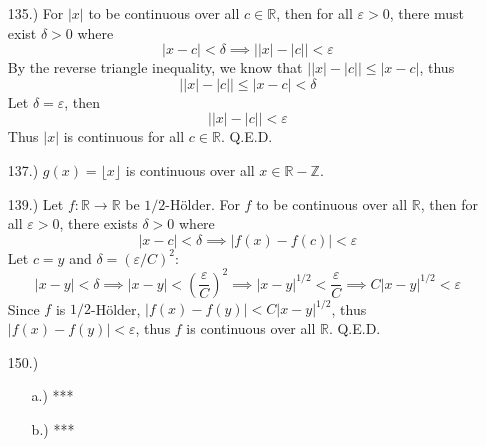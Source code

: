 \documentclass[12pt]{article}
\newcommand{\vertb}[1]{\left\vert#1\right\vert}
\newcommand{\parns}[1]{\left(#1\right)}
\newcommand{\e}{\varepsilon}
\begin{document}
\begin{itemize}
    \item [135.)] For $\vertb{x}$ to be continuous over all $c\in\mathbb{R}$, then for all $\e>0$, there must exist $\delta>0$ where
    \[\vertb{x-c}<\delta\implies\big\vert{\vertb{x}-\vertb{c}}\big\vert<\e\]
    By the reverse triangle inequality, we know that $\big\vert{\vertb{x}-\vertb{c}}\big\vert\leq\vertb{x-c}$, thus
    \[\big\vert{\vertb{x}-\vertb{c}}\big\vert\leq\vertb{x-c}<\delta\]
    Let $\delta=\e$, then
    \[\big\vert{\vertb{x}-\vertb{c}}\big\vert<\e\]
    Thus $\vertb{x}$ is continuous for all $c\in\mathbb{R}$. Q.E.D.


    \item [137.)] $g(x)=\lfloor x\rfloor$ is continuous over all $x\in\mathbb{R}-\mathbb{Z}$.

 
    \item [139.)] Let $f:\mathbb R\to\mathbb R$ be $1/2$-H\"older. For $f$ to be continuous over all $\mathbb R$, then for all $\e>0$, there exists $\delta>0$ where
    \[\vertb{x-c}<\delta\implies\vertb{f(x)-f(c)}<\e\]
    Let $c=y$ and $\delta=(\e/C)^2$:
    \[\vertb{x-y}<\delta\implies\vertb{x-y}<\parns{\frac{\e}{C}}^2\implies\vertb{x-y}^{1/2}<\frac{\e}{C}\implies C\vertb{x-y}^{1/2}<\e\]
    Since $f$ is $1/2$-H\"older, $\vertb{f(x)-f(y)}<C\vertb{x-y}^{1/2}$, thus $\vertb{f(x)-f(y)}<\e$, thus $f$ is continuous over all $\mathbb{R}$. Q.E.D.









    \item [150.)] \begin{itemize}
        \item [a.)] ***
        
        \item [b.)] ***
     \end{itemize}



\end{itemize}
\end{document}

